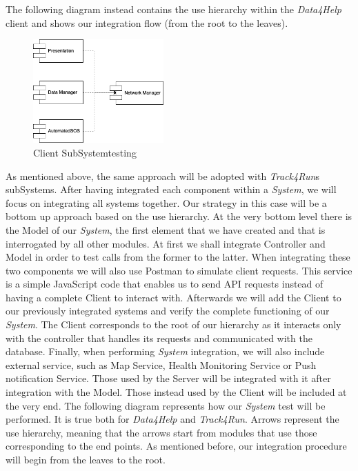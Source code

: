 \documentclass[titlepage]{article}
\begin{document}
	\noindent
	The following diagram instead contains the use hierarchy within the {\it Data4Help} client and shows our integration flow (from the root to the leaves).
	\begin{figure}[H]
		\center
		\includegraphics[width=5cm]{clientSubSystemTesting.png}
		\caption{Client SubSystemtesting}
		\label{fig:clientSubSystemTesting}
	\end{figure} 
	\noindent
	As mentioned above, the same approach will be adopted with {\it Track4Run}\textsc{}s subSystems.
	\newline
	\newline
	After having integrated each component within a {\it System}, we will focus on integrating all systems together. Our strategy in this case will be a bottom up approach based on the use hierarchy. At the very bottom level there is the Model of our {\it System}, the first element that we have created and that is interrogated by all other modules. At first we shall integrate Controller and Model in order to test calls from the former to the latter. When integrating these two components we will also use Postman to simulate client requests. This service is a simple JavaScript code that enables us to send API requests instead of having a complete Client to interact with. 
	Afterwards we will add the Client to our previously integrated systems and verify the complete functioning of our {\it System}. The Client corresponds to the root of our hierarchy as it interacts only with the controller that handles its requests and communicated with the database.
	Finally, when performing {\it System} integration, we will also include external service, such as Map Service, Health Monitoring Service or Push notification Service. Those used by the Server will be integrated with it after integration with the Model. Those instead used by the Client will be included at the very end.
	\newline
	\newline
	The following diagram represents how our {\it System} test will be performed. It is true both for {\it Data4Help} and {\it Track4Run}. Arrows represent the use hierarchy, meaning that the arrows start from modules that use those corresponding to the end points. As mentioned before, our integration procedure will begin from the leaves to the root.
\end{document}
